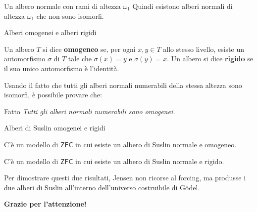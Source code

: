\documentclass{beamer}
\theoremstyle{num.custom-title}
\theoremstyle{custom-title}
\newcommand{\ZFC}{\ensuremath{\mathsf{ZFC}}\xspace}
\renewcommand{\emph}[1]{\textbf{#1}}
\begin{document}
\begin{frame}{Un albero normale con rami di altezza $\omega_1$}
Quindi esistono alberi normali di altezza $\omega_1$ che non sono isomorfi.
\end{frame}


\begin{frame}{Alberi omogenei e alberi rigidi}

\begin{definition}
Un albero $T$ si dice \emph{omogeneo} se, per ogni $x,y \in T$ allo stesso livello, esiste un automorfismo $\sigma$ di $T$ tale che $\sigma(x)=y$ e $\sigma(y)=x$. Un albero si dice \emph{rigido} se il suo unico automorfismo è l'identità.
\end{definition}

\pause

Usando il fatto che tutti gli alberi normali numerabili della stessa altezza sono isomorfi, è possibile provare che:

\begin{block}{Fatto}
\textit{Tutti gli alberi normali numerabili sono omogenei.}
\end{block}

\end{frame}


\begin{frame}{Alberi di Suslin omogenei e rigidi}

\begin{theorem}[Jensen, 1971]
C'è un modello di \ZFC in cui esiste un albero di Suslin normale e omogeneo.
\end{theorem}

\pause

\begin{theorem}[Jensen, 1971]
C'è un modello di \ZFC in cui esiste un albero di Suslin normale e rigido.
\end{theorem}

\pause

Per dimostrare questi due risultati, Jensen non ricorse al forcing, ma produsse i due alberi di Suslin all'interno dell'universo costruibile di Gödel.

\end{frame}


\begin{frame}[plain]
\begin{center}
\Large \textbf{Grazie per l'attenzione!}
\end{center}
\end{frame}
\end{document}
